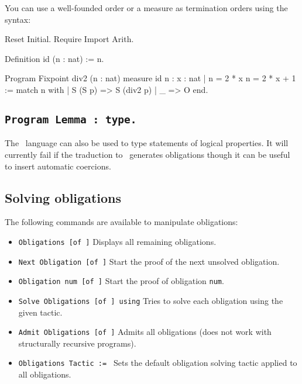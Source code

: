 You can use a well-founded order or a measure as termination orders using the syntax:
\begin{coq_eval}
Reset Initial.
Require Import Arith.
\end{coq_eval}
\begin{coq_example}
Definition id (n : nat) := n.

Program Fixpoint div2 (n : nat) {measure id n} : { x : nat | n = 2 * x \/ n = 2 * x + 1 } :=
  match n with
  | S (S p) => S (div2 p)
  | _ => O
  end.
\end{coq_example}

\subsection{\tt Program Lemma {\ident} : type.
  \label{ProgramLemma}}

The \Russell\ language can also be used to type statements of logical
properties. It will currently fail if the traduction to \Coq\
generates obligations though it can be useful to insert automatic coercions.

\subsection{Solving obligations}
The following commands are available to manipulate obligations:

\begin{itemize}
\item {\tt Obligations [of \ident]} Displays all remaining
  obligations.
\item {\tt Next Obligation [of \ident]} Start the proof of the next
  unsolved obligation.
\item {\tt Obligation num [of \ident]} Start the proof of
  obligation {\tt num}.
\item {\tt Solve Obligations [of \ident] using} {\tacexpr} Tries to solve
  each obligation using the given tactic.
\item {\tt Admit Obligations [of \ident]} Admits all
  obligations (does not work with structurally recursive programs).
\item {\tt Obligations Tactic := \tacexpr} Sets the default obligation
  solving tactic applied to all obligations.
\end{itemize}
  


